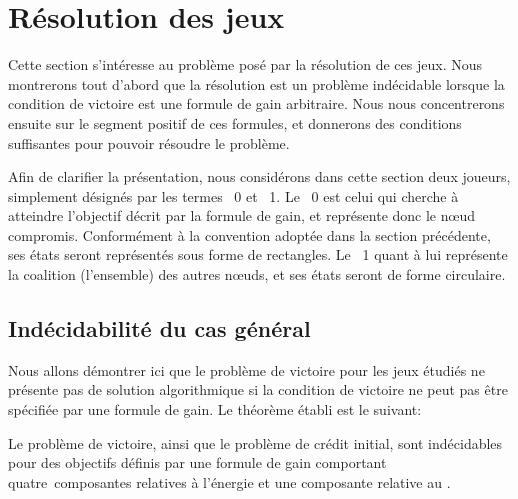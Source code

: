 \section{Résolution des jeux}
\label{tj:sec:algo}

Cette section s'intéresse au problème posé par la résolution de ces jeux.
Nous montrerons tout d'abord que la résolution est un problème indécidable lorsque la condition de victoire est une formule de gain arbitraire.
Nous nous concentrerons ensuite sur le segment positif de ces formules, et donnerons des conditions suffisantes pour pouvoir résoudre le problème.

\newcommand\jo{\idx{joueur}~0\xspace}
\newcommand\ji{\idx{joueur}~1\xspace}
Afin de clarifier la présentation, nous considérons dans cette section deux joueurs, simplement désignés par les termes \jo et \ji.
Le \jo est celui qui cherche à atteindre l'objectif décrit par la formule de gain, et représente donc le nœud compromis.
Conformément à la convention adoptée dans la section précédente, ses états seront représentés sous forme de rectangles.
Le \ji quant à lui représente la coalition (l'ensemble) des autres nœuds, et ses états seront de forme circulaire.

\subsection{Indécidabilité du cas général}

Nous allons démontrer ici que le problème de victoire pour les jeux étudiés ne présente pas de solution algorithmique si la condition de victoire ne peut pas être spécifiée par une formule de gain.
Le théorème établi est le suivant:
\begin{theorem}
    Le problème de victoire, ainsi que le problème de crédit initial, sont indécidables pour des objectifs définis par une formule de gain comportant quatre~composantes relatives à l'énergie et une composante relative au .
\end{theorem}

